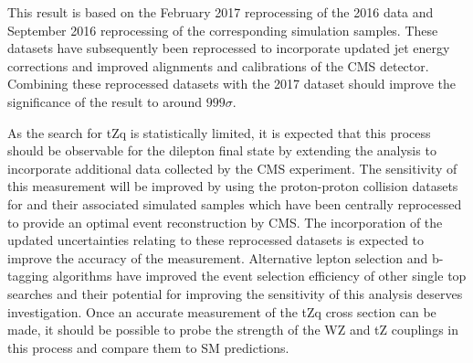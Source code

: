 This result is based on the February 2017 reprocessing of the 2016 data and September 2016 reprocessing of the corresponding simulation samples.
These datasets have subsequently been reprocessed to incorporate updated jet energy corrections and improved alignments and calibrations of the CMS detector.
Combining these reprocessed datasets with the 2017 dataset should improve the significance of the result to around $999\sigma$.

As the search for tZq is statistically limited, it is expected that this process should be observable for the dilepton final state by extending the analysis to incorporate additional data collected by the CMS experiment.
The sensitivity of this measurement will be improved by using the proton-proton collision datasets for and their associated simulated samples which have been centrally reprocessed to provide an optimal event reconstruction by CMS.
The incorporation of the updated uncertainties relating to these reprocessed datasets is  expected to improve the accuracy of the measurement.
Alternative lepton selection and b-tagging algorithms have improved the event selection efficiency of other single top searches and their potential for improving the sensitivity of this analysis deserves investigation.
Once an accurate measurement of the tZq cross section can be made, it should be possible to probe  the strength of the WZ and tZ couplings in this process and compare them to SM predictions.

%

